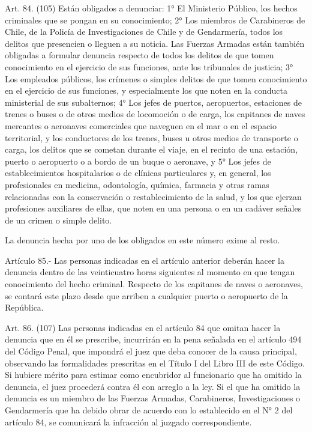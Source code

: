     Art. 84. (105) Están obligados a denunciar:
    1° El Ministerio Público, los hechos criminales que se pongan en su conocimiento;
    2° Los miembros de Carabineros de Chile, de la Policía de Investigaciones de Chile y de Gendarmería, todos los delitos que presencien o lleguen a su noticia.
Las Fuerzas Armadas están también obligadas a formular denuncia respecto de todos los delitos de que tomen conocimiento en el ejercicio de sus funciones, ante los tribunales de justicia;
    3° Los empleados públicos, los crímenes o simples delitos de que tomen conocimiento en el ejercicio de sus funciones, y especialmente los que noten en la conducta ministerial de sus subalternos;
    4° Los jefes de puertos, aeropuertos, estaciones de trenes o buses o de otros medios de locomoción o de carga, los capitanes de naves mercantes o aeronaves comerciales que naveguen en el mar o en el espacio territorial, y los conductores de los trenes, buses u otros medios de transporte o carga, los delitos que se cometan durante el viaje, en el recinto de una estación, puerto o aeropuerto o a bordo de un buque o aeronave, y
    5° Los jefes de establecimientos hospitalarios o de clínicas particulares y, en general, los profesionales en medicina, odontología, química, farmacia y otras ramas relacionadas con la conservación o restablecimiento de la salud, y los que ejerzan profesiones auxiliares de ellas, que noten en una persona o en un cadáver señales de un crimen o simple delito.

    La denuncia hecha por uno de los obligados en este número exime al resto.

    Artículo 85.- Las personas indicadas en el artículo anterior deberán hacer la denuncia dentro de las veinticuatro horas siguientes al momento en que tengan conocimiento del hecho criminal. Respecto de los capitanes de naves o aeronaves, se contará este plazo desde que arriben a cualquier puerto o aeropuerto de la República.

    Art. 86. (107) Las personas indicadas en el artículo 84 que omitan hacer la denuncia que en él se prescribe, incurrirán en la pena señalada en el artículo 494 del Código Penal, que impondrá el juez que deba conocer de la causa principal, observando las formalidades prescritas en el Título I del Libro III de este Código.
    Si hubiere mérito para estimar como encubridor al funcionario que ha omitido la denuncia, el juez procederá contra él con arreglo a la ley.
    Si el que ha omitido la denuncia es un miembro de las Fuerzas Armadas, Carabineros, Investigaciones o Gendarmería que ha debido obrar de acuerdo con lo establecido en el N° 2 del artículo 84, se comunicará la infracción al juzgado correspondiente.

